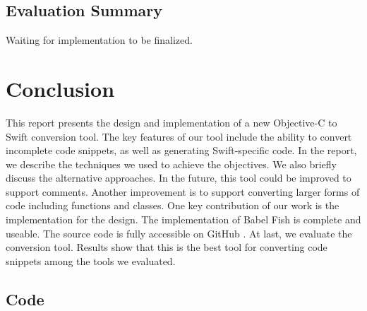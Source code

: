 \documentclass{sfuthesis}
\begin{document}
\section{Evaluation Summary}

Waiting for implementation to be finalized.

\chapter{Conclusion}

This report presents the design and implementation of a new Objective-C to Swift conversion tool. The key features of our tool include the ability to convert incomplete code snippets, as well as generating Swift-specific code. In the report, we describe the techniques we used to achieve the objectives. We also briefly discuss the alternative approaches. In the future, this tool could be improved to support comments. Another improvement is to support converting larger forms of code including functions and classes.
One key contribution of our work is the implementation for the design. The implementation of Babel Fish is complete and useable. The source code is fully accessible on GitHub \cite{babelswift}. At last, we evaluate the conversion tool. Results show that this is the best tool for converting code snippets among the tools we evaluated.


%
%
%
%
%

\backmatter%
	
	

\begin{appendices} %
	\chapter{Code}
\end{appendices}
\end{document}
